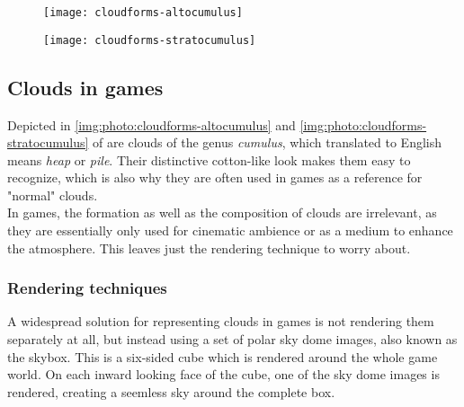 \begin{figure}[ht]
    \centering
        \begin{minipage}{0.47\linewidth}
            \texttt{[image: cloudforms-altocumulus]}
            \label{img:photo:cloudforms-altocumulus}        
        \end{minipage}        
    \hfill
        \begin{minipage}{0.47\linewidth}
            \texttt{[image: cloudforms-stratocumulus]}
            \label{img:photo:cloudforms-stratocumulus}        
        \end{minipage}  
\end{figure}



\subsection{Clouds in games}
Depicted in \autoref{img:photo:cloudforms-altocumulus} and \autoref{img:photo:cloudforms-stratocumulus} of  are clouds of the genus \textit{cumulus}, which translated to English means \textit{heap} or \textit{pile}.
Their distinctive cotton-like look makes them easy to recognize, which is also why they are often used in games as a reference for "normal" clouds. 
\\
In games, the formation as well as the composition of clouds are irrelevant, as they are essentially only used for cinematic ambience or as a medium to enhance the atmosphere. This leaves just the rendering technique to worry about.

\subsubsection{Rendering techniques}
A widespread solution for representing clouds in games is not rendering them separately at all, but instead using a set of polar sky dome images, also known as the skybox. This is a six-sided cube which is rendered around the whole game world. On each inward looking face of the cube, one of the sky dome images is rendered, creating a seemless sky around the complete box.

